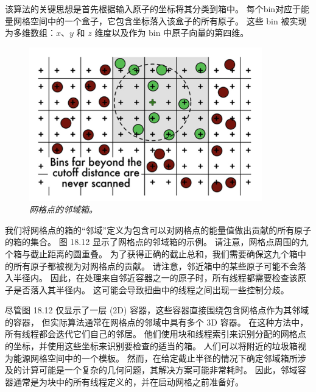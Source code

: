 该算法的关键思想是首先根据输入原子的坐标将其分类到箱中。 
每个bin对应于能量网格空间中的一个盒子，它包含坐标落入该盒子的所有原子。 
这些 bin 被实现为多维数组：$x、y$ 和 $z$ 维度以及作为 bin 中原子向量的第四维。

\begin{figure}[H]
	\centering
	\includegraphics[width=0.9\textwidth]{figs/F18.12.png}
	\caption{\textit{网格点的邻域箱。}}
\end{figure}

我们将网格点的箱的“邻域”定义为包含可以对网格点的能量值做出贡献的所有原子的箱的集合。 
图 18.12 显示了网格点的邻域箱的示例。 请注意，网格点周围的九个箱与截止距离的圆重叠。 
为了获得正确的截止总和，我们需要确保这九个箱中的所有原子都被视为对网格点的贡献。 
请注意，邻近箱中的某些原子可能不会落入半径内。 
因此，在处理来自邻近容器之一的原子时，所有线程都需要检查该原子是否落入其半径内。 
这可能会导致扭曲中的线程之间出现一些控制分歧。

尽管图 18.12 仅显示了一层 (2D) 容器，这些容器直接围绕包含网格点作为其邻域的容器，
但实际算法通常在网格点的邻域中具有多个 3D 容器。 在这种方法中，所有线程都会迭代它们自己的邻居。 
他们使用块和线程索引来识别分配的网格点的坐标，并使用这些坐标来识别要检查的适当的箱。 
人们可以将附近的垃圾箱视为能源网格空间中的一个模板。 
然而，在给定截止半径的情况下确定邻域箱所涉及的计算可能是一个复杂的几何问题，其解决方案可能非常耗时。 
因此，邻域容器通常是为块中的所有线程定义的，并在启动网格之前准备好。

